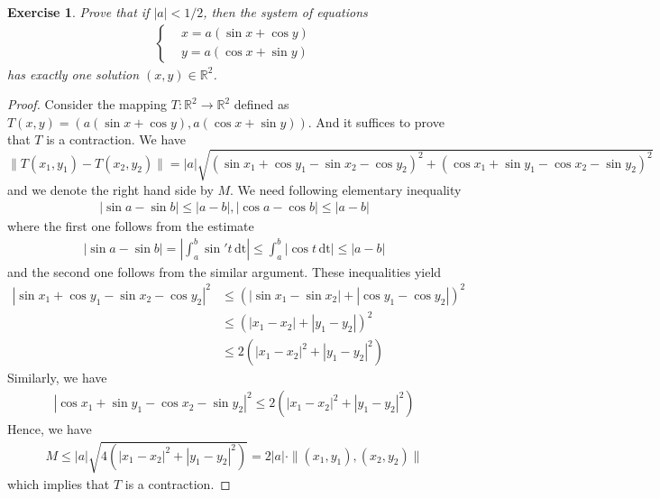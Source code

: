 \documentclass[12pt,leqno]{amsart}
\newtheorem{exercise}{Exercise}[section]
\theoremstyle{definition}
\numberwithin{equation}{subsection}
\begin{document}
\medskip

\begin{exercise}
Prove that if $\left|a\right| < 1/2$, then the system of equations
\begin{align*}
    \left\{
    \begin{aligned}
        & x = a(\sin x + \cos y)\\
        & y = a(\cos x + \sin y)
    \end{aligned}
    \right.
\end{align*}
has exactly one solution $(x,y)\in \mathbb{R}^2$.
\end{exercise}
\begin{proof}
Consider the mapping $T:\mathbb{R}^2\to\mathbb{R}^2$ defined as $T(x,y) = \left(a(\sin x + \cos y), a(\cos x + \sin y)\right)$. And it suffices to prove that $T$ is a contraction. We have
\begin{dmath}
    \|T(x_1,y_1) - T(x_2,y_2)\| = |a|\sqrt{(\sin x_1 + \cos y_1 - \sin x_2 - \cos y_2)^2 
    + (\cos x_1 + \sin y_1 - \cos x_2 - \sin y_2)^2}
\end{dmath}
and we denote the right hand side by $M$. We need following elementary inequality 
\begin{align*}
    \left|\sin a - \sin b\right| \leq \left|a - b\right|, \left|\cos a - \cos b\right| \leq \left|a - b\right|
\end{align*}
where the first one follows from the estimate 
\begin{align*}
    \left|\sin a - \sin b\right| = \left|\int^b_a \sin' t \,\text{dt} \right| \leq \int^b_a \left|\cos t \,\text{dt}\right| \leq \left|a - b\right|
\end{align*}
and the second one follows from the similar argument. These inequalities yield 
\begin{align*}
    \left|\sin x_1 + \cos y_1 - \sin x_2 - \cos y_2\right|^2 &\leq \left(\left|\sin x_1 - \sin x_2\right| + \left|\cos y_1 - \cos y_2\right|\right)^2 \\
    &\leq \left(\left|x_1 - x_2\right| + \left|y_1 - y_2\right|\right)^2 \\
    &\leq 2 \left(\left|x_1 - x_2\right|^2 + \left|y_1 - y_2\right|^2 \right)
\end{align*}
Similarly, we have 
\begin{align*}
    \left|\cos x_1 + \sin y_1 - \cos x_2 - \sin y_2\right|^2 \leq 2 \left(\left|x_1 - x_2\right|^2 + \left|y_1 - y_2\right|^2 \right)
\end{align*}
Hence, we have 
\begin{align*}
    M \leq |a| \sqrt{4 \left(\left|x_1 - x_2\right|^2 + \left|y_1 - y_2\right|^2 \right)} = 2|a| \cdot \|(x_1,y_1),(x_2,y_2)\|
\end{align*}
which implies that $T$ is a contraction.
\end{proof}
\end{document}
